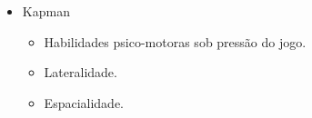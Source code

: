 \begin{itemize}
	\item Kapman
	\begin{itemize}
		\item Habilidades psico-motoras sob pressão do jogo.
		\item Lateralidade.
		\item Espacialidade.
	\end{itemize}
\end{itemize}
